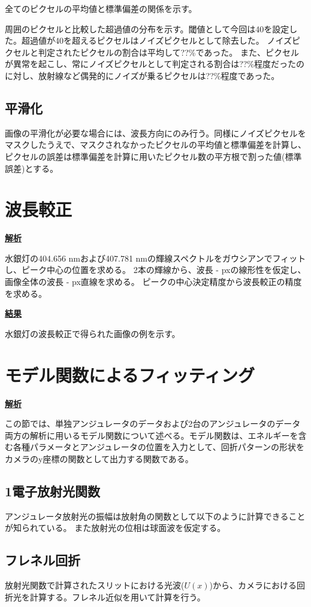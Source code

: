 \documentclass[a4paper,11pt,uplatex]{jsbook}
\begin{document}
全てのピクセルの平均値と標準偏差の関係を示す。

周囲のピクセルと比較した超過値の分布を示す。閾値として今回は40を設定した。超過値が40を超えるピクセルはノイズピクセルとして除去した。
ノイズピクセルと判定されたピクセルの割合は平均して??\%であった。
また、ピクセルが異常を起こし、常にノイズピクセルとして判定される割合は??\%程度だったのに対し、放射線など偶発的にノイズが乗るピクセルは??\%程度であった。
\subsection{平滑化}
画像の平滑化が必要な場合には、波長方向にのみ行う。同様にノイズピクセルをマスクしたうえで、マスクされなかったピクセルの平均値と標準偏差を計算し、ピクセルの誤差は標準偏差を計算に用いたピクセル数の平方根で割った値(標準誤差)とする。

\section{波長較正}
\noindent \textbf{\underline{解析}}\par
水銀灯の404.656 nmおよび407.781 nmの輝線スペクトルをガウシアンでフィットし、ピーク中心の位置を求める。
2本の輝線から、波長 - pxの線形性を仮定し、画像全体の波長 - px直線を求める。
ピークの中心決定精度から波長較正の精度を求める。

\noindent \textbf{\underline{結果}}\par
水銀灯の波長較正で得られた画像の例を示す。

\section{モデル関数によるフィッティング}
\noindent \textbf{\underline{解析}}\par
この節では、単独アンジュレータのデータおよび2台のアンジュレータのデータ両方の解析に用いるモデル関数について述べる。モデル関数は、エネルギーを含む各種パラメータとアンジュレータの位置を入力として、回折パターンの形状をカメラのy座標の関数として出力する関数である。
\subsection{1電子放射光関数}
アンジュレータ放射光の振幅は放射角の関数として以下のように計算できることが知られている。
また放射光の位相は球面波を仮定する。

\subsection{フレネル回折}
放射光関数で計算されたスリットにおける光波($U(x)$)から、カメラにおける回折光を計算する。フレネル近似を用いて計算を行う。
\end{document}
